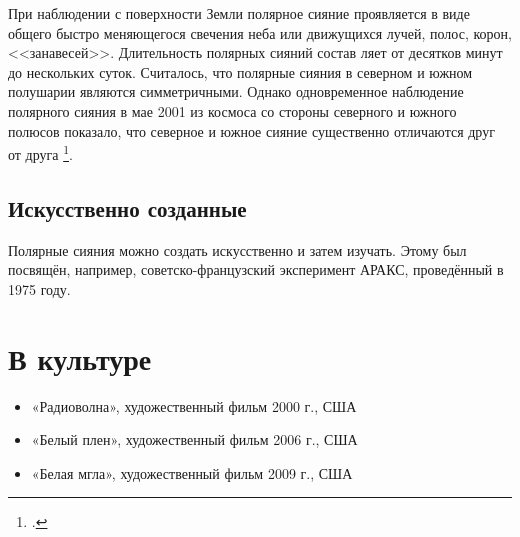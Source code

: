 \documentclass[a4paper,14pt]{article}
\begin{document}
При наблюдении с поверхности Земли полярное сияние проявляется в виде общего быстро меняющегося свечения неба или движущихся лучей, полос, корон, <<занавесей>>. Длительность полярных сияний состав ляет от десятков минут до нескольких суток. Считалось, что полярные сияния в северном и южном полушарии являются симметричными. Однако одновременное наблюдение полярного сияния в мае 2001 из космоса со стороны северного и южного полюсов показало, что северное и южное сияние существенно отличаются друг от друга \footcite[P. 20]{Kruesi2009Aurorae}. %

\subsection{Искусственно созданные}
Полярные сияния можно создать искусственно и затем изучать. Этому был посвящён, например, советско-французский эксперимент АРАКС, проведённый в 1975 году.

\section{В культуре}

\begin{itemize}[label=\textcolor{blue}{\textbullet}]
	\item «Радиоволна», художественный фильм 2000 г., США
	\item «Белый плен», художественный фильм 2006 г., США
	\item «Белая мгла», художественный фильм 2009 г., США
\end{itemize}

\nocite{*}
\printbibliography
\end{document}

